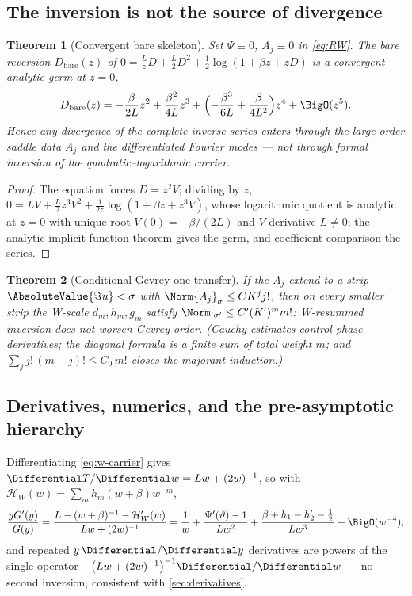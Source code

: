 \documentclass[11pt,oneside]{article}
\numberwithin{equation}{section}
\newtheorem{theorem}{Theorem}[section]
\theoremstyle{definition}
\theoremstyle{remark}
\begin{document}
\subsection{The inversion is not the source of divergence}

\begin{theorem}[Convergent bare skeleton]
\label{thm:bare-skeleton}
Set $\Psi\equiv0$, $A_j\equiv0$ in \eqref{eq:RW}.  The bare reversion
$D_{\mathrm{bare}}(z)$ of
$0=\tfrac LzD+\tfrac L2D^{2}
+\tfrac12\log(1+\beta z+zD)$ is a \emph{convergent} analytic germ at
$z=0$,
\begin{equation}
 D_{\mathrm{bare}}(z)
 =-\frac{\beta}{2L}z^{2}
 +\frac{\beta^{2}}{4L}z^{3}
 +\Bigl(-\frac{\beta^{3}}{6L}+\frac{\beta}{4L^{2}}\Bigr)z^{4}
 +\BigO(z^{5}).
 \label{eq:bare-series}
\end{equation}
Hence any divergence of the complete inverse series enters through
the large-order saddle data $A_j$ and the differentiated Fourier
modes --- not through formal inversion of the
quadratic--logarithmic carrier.
\end{theorem}

\begin{proof}
The equation forces $D=z^{2}V$; dividing by $z$,
$0=LV+\tfrac L2z^{3}V^{2}
+\tfrac1{2z}\log(1+\beta z+z^{3}V)$, whose logarithmic quotient is
analytic at $z=0$ with unique root $V(0)=-\beta/(2L)$ and
$V$-derivative $L\ne0$; the analytic implicit function theorem gives
the germ, and coefficient comparison the series.
\end{proof}

\begin{theorem}[Conditional Gevrey-one transfer]
\label{thm:gevrey-transfer}
If the $A_j$ extend to a strip $\AbsoluteValue{\Im u}<\sigma$ with
$\Norm{A_j}_\sigma\le CK^{j}j!$, then on every smaller strip the
W-scale $d_m,h_m,g_m$ satisfy
$\Norm\cdot_{\sigma'}\le C'(K')^{m}m!$: W-resummed inversion does not
worsen Gevrey order.  (Cauchy estimates control phase derivatives;
the diagonal formula is a finite sum of total weight $m$; and
$\sum_jj!\,(m-j)!\le C_0\,m!$ closes the majorant induction.)
\end{theorem}

\subsection{Derivatives, numerics, and the pre-asymptotic hierarchy}

Differentiating \eqref{eq:w-carrier} gives
$\Differential T/\Differential w=Lw+(2w)^{-1}$, so with
$\mathcal H_W(w)=\sum_mh_m(w+\beta)w^{-m}$,
\begin{equation}
 \frac{yG'(y)}{G(y)}
 =\frac{L-(w+\beta)^{-1}-\mathcal H_W'(w)}{Lw+(2w)^{-1}}
 =\frac1w+\frac{\Psi'(\vartheta)-1}{Lw^{2}}
 +\frac{\beta+h_1-h_2'-\tfrac12}{Lw^{3}}
 +\BigO(w^{-4}),
 \label{eq:W-elasticity}
\end{equation}
and repeated $y\,\Differential/\Differential y$ derivatives are powers of the single
operator $-\bigl(Lw+(2w)^{-1}\bigr)^{-1}\Differential/\Differential w$ --- no second
inversion, consistent with \cref{sec:derivatives}.
\end{document}
